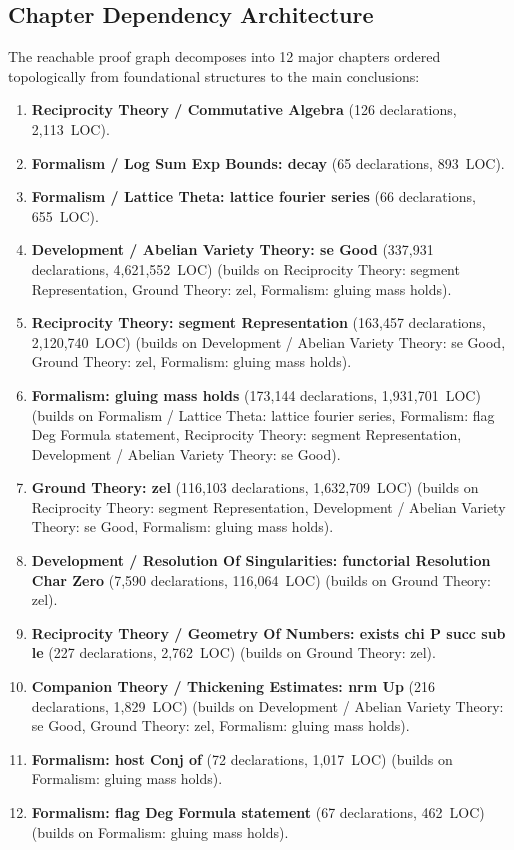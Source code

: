 \documentclass[11pt,reqno]{amsart}
\theoremstyle{plain}
\theoremstyle{definition}
\begin{document}
\subsection{Chapter Dependency Architecture}
The reachable proof graph decomposes into 12 major chapters ordered topologically from foundational structures to the main conclusions:
\begin{enumerate}
\item \textbf{Reciprocity Theory / Commutative Algebra} (126 declarations, 2,113~LOC).
\item \textbf{Formalism / Log Sum Exp Bounds: decay} (65 declarations, 893~LOC).
\item \textbf{Formalism / Lattice Theta: lattice fourier series} (66 declarations, 655~LOC).
\item \textbf{Development / Abelian Variety Theory: se Good} (337,931 declarations, 4,621,552~LOC) (builds on Reciprocity Theory: segment Representation, Ground Theory: zel, Formalism: gluing mass holds).
\item \textbf{Reciprocity Theory: segment Representation} (163,457 declarations, 2,120,740~LOC) (builds on Development / Abelian Variety Theory: se Good, Ground Theory: zel, Formalism: gluing mass holds).
\item \textbf{Formalism: gluing mass holds} (173,144 declarations, 1,931,701~LOC) (builds on Formalism / Lattice Theta: lattice fourier series, Formalism: flag Deg Formula statement, Reciprocity Theory: segment Representation, Development / Abelian Variety Theory: se Good).
\item \textbf{Ground Theory: zel} (116,103 declarations, 1,632,709~LOC) (builds on Reciprocity Theory: segment Representation, Development / Abelian Variety Theory: se Good, Formalism: gluing mass holds).
\item \textbf{Development / Resolution Of Singularities: functorial Resolution Char Zero} (7,590 declarations, 116,064~LOC) (builds on Ground Theory: zel).
\item \textbf{Reciprocity Theory / Geometry Of Numbers: exists chi P succ sub le} (227 declarations, 2,762~LOC) (builds on Ground Theory: zel).
\item \textbf{Companion Theory / Thickening Estimates: nrm Up} (216 declarations, 1,829~LOC) (builds on Development / Abelian Variety Theory: se Good, Ground Theory: zel, Formalism: gluing mass holds).
\item \textbf{Formalism: host Conj of} (72 declarations, 1,017~LOC) (builds on Formalism: gluing mass holds).
\item \textbf{Formalism: flag Deg Formula statement} (67 declarations, 462~LOC) (builds on Formalism: gluing mass holds).
\end{enumerate}
\end{document}

